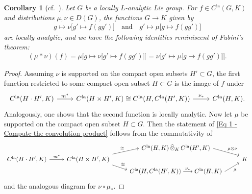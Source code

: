 \documentclass[a4paper, reqno, 10pt]{amsart}
\newtheorem{corollary}[theorem]{Corollary}
\theoremstyle{definition}
\numberwithin{equation}{section}
\newcommand{\cotimes}[1]{{\,\widehat{\otimes}_{#1}\,}}
\newcommand{\la}{{\mathrm{la}}}
\newcommand{\lra}{\longrightarrow}
\newcommand{\lto}{\longmapsto}
\newcommand{\mto}{\mapsto}
\newcommand{\ra}{\rightarrow}
\begin{document}
\begin{corollary}[{cf.\ \cite[Proof of Prop.\ 3.5]{OrlikStrauch15JordanHoelderSerLocAnRep}}]\label{Cor 1 - Fubini theorem}
	Let $G$ be a locally $L$-analytic Lie group. 
	For $f \in C^\la(G,K)$ and distributions $\mu , \nu \in D(G)$, the functions $G \ra K$ given by
	\begin{align*}
		g \lto \nu \big[ g' \mto f(gg') \big] \quad\text{and}\quad g' \lto \mu \big[ g \mto f(gg') \big]
	\end{align*}
	are locally analytic, and we have the following identities reminiscent of Fubini's theorem:
	\begin{equation}\label{Eq 1 - Compute the convolution product}
		\begin{aligned}
			(\mu \ast \nu )(f) = \mu \big[g \mto \nu\big[g'\mto f(gg') \big]\big]
			= \nu\big[ g'\mto \mu\big[g \mto f(gg') \big]\big].
		\end{aligned}
	\end{equation}
\end{corollary}
\begin{proof}
	Assuming $\nu$ is supported on the compact open subsets $H'\subset G$, the first function restricted to some compact open subset $H\subset G$ is the image of $f$ under
	\begin{equation*}
		\begin{tikzcd}
			C^\la(H \cdot H',K) \ar[r, "m^\ast"] &C^\la(H \times H', K) \cong C^\la(H, C^\la(H',K)) \ar[r, "\nu_\ast"] &C^\la(H,K) .
		\end{tikzcd}
	\end{equation*}
	Analogously, one shows that the second function is locally analytic.
	Now let $\mu$ be supported on the compact open subset $H \subset G$.
	Then the statement of \eqref{Eq 1 - Compute the convolution product} follows from the commutativity of 
	\begin{equation*}
		\begin{tikzcd}[row sep = 0ex]
			&&C^\la(H,K) \cotimes{K} C^\la(H',K) \ar[rd, start anchor=east, end anchor=145, "\mu \otimes \nu"] & \\
			C^\la(H \cdot H',K) \ar[r, "m^\ast"] &C^\la(H \times H', K) \ar[ru, end anchor=west, "\cong"] \ar[rd, start anchor=south east, end anchor = 178, "\cong"] &&K \\
			&&C^\la(H, C^\la(H',K)) \overset{\nu_\ast}{\lra}  C^\la(H,K) \ar[ru, start anchor=east, "\mu"'] &
		\end{tikzcd}
	\end{equation*}
	and the analogous diagram for $\nu \circ \mu_\ast$.
\end{proof}
\end{document}
